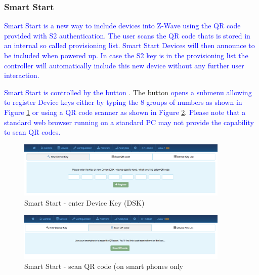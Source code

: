 \subsubsection{Smart Start}

\textcolor{blue}{Smart Start is a new way to include devices into Z-Wave using the QR code provided with S2
authentication.  The user scans the QR code thats is stored in an internal so called 
provisioning list. Smart Start Devices will then announce to be included when powered up.
In case the S2 key is in the provisioning list the controller will automatically include 
this new device without any further user interaction.}

\textcolor{blue}{Smart Start is controlled by the button} .
The button  \textcolor{blue}{opens a submenu allowing to register Device keys either 
by typing the 8 groups of numbers as shown in Figure }\ref{ss1} \textcolor{blue}{or using 
a QR code scanner as shown in Figure } \ref{ss2}. \textcolor{blue}{Please note that a standard
web browser running on a standard PC may not provide the capability to scan QR codes. } 

\begin{figure}
\begin{center}
\includegraphics[width=0.9\textwidth]{pngs/cap7/ss1.png}
\caption{Smart Start - enter Device Key (DSK)}
\label{ss1}
\end{center}
\end{figure}

\begin{figure}
\begin{center}
\includegraphics[width=0.9\textwidth]{pngs/cap7/ss2.png}
\caption{Smart Start - scan QR code (on smart phones only}
\label{ss2}
\end{center}
\end{figure}


